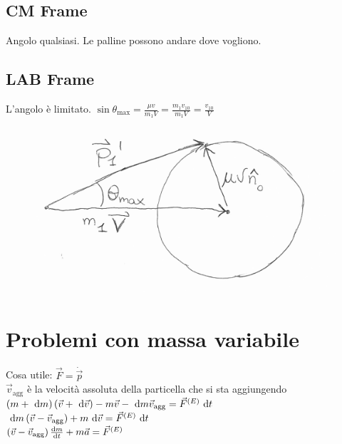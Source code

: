 \documentclass[a4paper,NoNotes,GeneralMath,12pt]{stdmdoc}
\begin{document}
	\begin{minipage}{0.6\textwidth}
	\subsection*{CM Frame}
	Angolo qualsiasi. Le palline possono andare dove vogliono.

	\subsection*{LAB Frame}
	L'angolo è limitato. $\sin \theta_{\text{max}} = \frac{\mu v}{m_1 V} = \frac{m_1 v_{10}}{m_1 V} = \frac{v_{10}}{V}$
	\end{minipage}
	\hfill
	\begin{minipage}{0.35\textwidth}
	\begin{figure}[H]
		\centering
		\includegraphics[width=\columnwidth]{AngoloMagico}
	\end{figure}
	\end{minipage}

	\section*{Problemi con massa variabile}
	Cosa utile: $\vec{F} = \dot{\vec{p}}$ \\
	$\vec{v}_\text{agg}$ è la velocità assoluta della particella che si sta aggiungendo \\
	$\left( m + \de m \right) \left( \vec{v} + \de \vec{v} \right) - m \vec{v} - \de m \vec{v}_\text{agg} = \vec{F}^{(E)} \de t$ \\
	$\de{m} \left( \vec{v} - \vec{v}_\text{agg} \right) + m \de{\vec{v}} = \vec{F}^{(E)} \de{t}$ \\
	$\left( \vec{v} - \vec{v}_\text{agg} \right) \de{m}{t} + m \vec{a} = \vec{F}^{(E)}$
\end{document}
